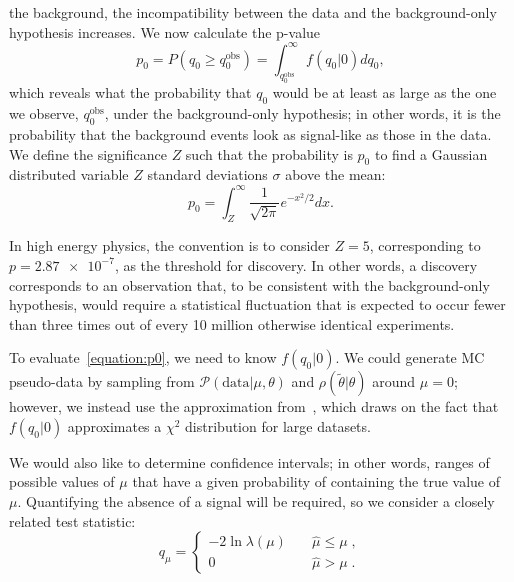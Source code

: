 the background, the incompatibility between the data and the
background-only hypothesis increases. We now calculate the p-value
\begin{equation}
  \label{equation:p0}
  p_0 = P(q_0 \geq q_0^\text{obs}) = \int_{q_0^\text{obs}}^\infty f(q_0|0) dq_0,
\end{equation}
which reveals what the probability that $q_0$ would be at least as large as
the one we observe, $q_0^\text{obs}$, under the background-only hypothesis; in
other words, it is the probability that the background events look as
signal-like as those in the data. We define the significance $Z$ such that
the probability is $p_0$ to find a Gaussian distributed variable $Z$ standard
deviations $\sigma$ above the mean:
\begin{equation}
  \label{equation:Z}
  p_0 = \int_Z^\infty \frac{1}{\sqrt{2\pi}}e^{-x^2/2}dx.
\end{equation}

In high energy physics, the convention is to consider $Z=5$, corresponding to $p =
\num{2.87e-7}$, as the threshold for discovery. In other words, a discovery
corresponds to an observation that, to be consistent with the
background-only hypothesis, would require a statistical fluctuation that is
expected to occur fewer than three times out of every 10 million otherwise
identical experiments.

To evaluate~\cref{equation:p0}, we need to know $f(q_0|0)$. We could generate MC
pseudo-data by sampling from $\mathcal{P}(\text{data}|\mu, \theta)$ and
$\rho(\widetilde{\theta}|\theta)$ around $\mu=0$; however, we instead use the
approximation from~\cite{Cowan2011}, which draws on the fact that $f(q_0|0)$
approximates a $\chi^2$ distribution for large datasets.

We would also like to determine confidence intervals; in other words, ranges of
possible values of $\mu$ that have a given probability of containing the true
value of $\mu$. Quantifying the absence of a signal will be required, so we
consider a closely related test statistic:
\begin{equation}
  \label{eq:qmu}
  q_{\mu} =
  \left\{ \! \! \begin{array}{ll}
    - 2 \ln \lambda(\mu) & \quad \hat{\mu} \leq \mu \;, \\
               0 & \quad \hat{\mu} > \mu  \;.
  \end{array}
       \right.
\end{equation}

